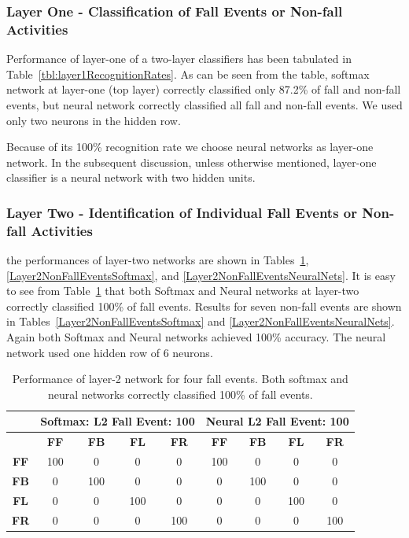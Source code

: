 \documentclass[]{IEEEtran}
\begin{document}
\subsubsection{Layer One - Classification of Fall Events or Non-fall Activities
} \label{sec:LayerOneFallAndNonFallIdentification}

Performance of layer-one of a two-layer classifiers has been tabulated in
Table~\ref{tbl:layer1RecognitionRates}. As can be seen from the table, softmax
network at layer-one (top layer) correctly classified only 87.2\% of fall and
non-fall events, but neural network correctly classified all fall and non-fall
events. We used only two neurons in the hidden row.  \par Because of its 100\%
recognition rate we choose neural networks as layer-one network. In the
subsequent discussion, unless otherwise mentioned,  layer-one classifier is a
neural network with two hidden units.


\subsubsection{Layer Two - Identification of Individual Fall Events or Non-fall
Activities} \label{sec:LayerTwoFallOrNonFallEventIdentification}

the performances of layer-two networks are shown in
Tables~\ref{Layer2FallEvents}, \ref{Layer2NonFallEventsSoftmax}, and
\ref{Layer2NonFallEventsNeuralNets}. It is easy to see from
Table~\ref{Layer2FallEvents} that both Softmax and Neural networks at layer-two
correctly classified 100\% of fall events.  Results for seven non-fall events
are shown in Tables~\ref{Layer2NonFallEventsSoftmax} and
\ref{Layer2NonFallEventsNeuralNets}. Again both Softmax and Neural networks
achieved 100\% accuracy. The neural network used one hidden row of 6 neurons.
\begin{table}[htb]
\resizebox{\columnwidth}{!}
{
\begin{tabular}{|c|c|c|c|c||c|c|c|c|}
\hline 
& \multicolumn{4}{c||}{\bf Softmax: L2 Fall Event: 100} & \multicolumn{4}{c|}{\bf Neural 
L2 Fall Event: 100} \\ \hline
& \textbf{FF} & \textbf{FB}  & \textbf{FL} & \textbf{FR} & \textbf{FF} & \textbf{FB}  & 
\textbf{FL} & \textbf{FR} \\ \hline
\textbf{FF} & 100 &  0 &  0 &  0  & 100 &  0 &  0 &  0\\ \hline
\textbf{FB} & 0 &  100 &  0 &  0  & 0 &  100 &  0 &  0\\ \hline
\textbf{FL} & 0 &  0 &  100 &  0  & 0 &  0 &  100 &  0\\ \hline
\textbf{FR} & 0 &  0 &  0 &  100  & 0 &  0 &  0 &  100 \\ \hline
\end{tabular}
}
\caption{ Performance of layer-2 network for  four fall events. Both softmax
and neural networks correctly classified 100\% of fall events.}
\label{Layer2FallEvents}
\end{table}
\end{document}
